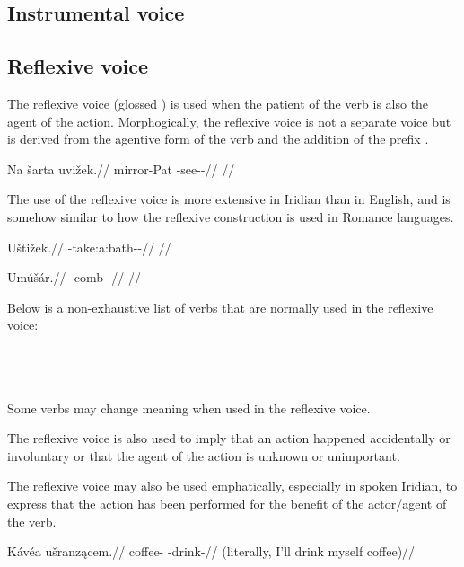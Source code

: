 \subsection{Instrumental voice}


\subsection{Reflexive voice}

The reflexive voice (glossed {\Refl}) is used when the patient of the verb is also the agent of the action. Morphogically, the reflexive voice is not a separate voice but is derived from the agentive form of the verb and the addition of the prefix .

\pex
\begingl
\gla Na šarta uvižek.//
\glb \Loc{} mirror-Pat{} \Refl{}-see-\Av{}-\Pf{}//
\glft {}//
\endgl
\xe

The use of the reflexive voice is more extensive in Iridian than in English, and is somehow similar to how the reflexive construction is used in Romance languages.

\pex
\begingl
\gla Uštižek.//
\glb \Refl{}-take:a:bath-\Av{}-\Pf{}//
\glft {}//
\endgl
\xe

\pex
\begingl
\gla Umúš\'ar.//
\glb \Refl{}-comb-\Av{}-\Prog{}//
\glft {}//
\endgl
\xe

Below is a non-exhaustive list of verbs that are normally used in the reflexive voice:
\bigskip

\noindent
{} \\
 \\
 \\

Some verbs may change meaning when used in the reflexive voice.


The reflexive voice is also used to imply that an action happened accidentally or involuntary or that the agent of the action is unknown or unimportant.

The reflexive voice may also be used emphatically, especially in spoken Iridian, to express that the action has been performed for the benefit of the actor/agent of the verb.

\pex
\begingl
\gla Kávéa ušranz\k{a}cem.//
\glb coffee-\Pat{} \Refl{}-drink-//
\glft {} (literally, I'll drink myself coffee)//
\endgl
\xe

